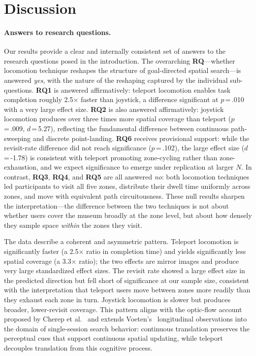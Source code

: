 \documentclass{vgtc}
\begin{document}
\section{Discussion}

\paragraph{Answers to research questions.}
Our results provide a clear and internally consistent set of answers to the research questions posed in the introduction. The overarching \textbf{RQ}---whether locomotion technique reshapes the structure of goal-directed spatial search---is answered \emph{yes}, with the nature of the reshaping captured by the individual sub-questions. \textbf{RQ1} is answered affirmatively: teleport locomotion enables task completion roughly 2.5$\times$ faster than joystick, a difference significant at $p$\,=\,.010 with a very large effect size. \textbf{RQ2} is also answered affirmatively: joystick locomotion produces over three times more spatial coverage than teleport ($p$\,=\,.009, $d$\,=\,5.27), reflecting the fundamental difference between continuous path-sweeping and discrete point-landing. \textbf{RQ6} receives provisional support: while the revisit-rate difference did not reach significance ($p$\,=\,.102), the large effect size ($d$\,=\,-1.78) is consistent with teleport promoting zone-cycling rather than zone-exhaustion, and we expect significance to emerge under replication at larger $N$. In contrast, \textbf{RQ3}, \textbf{RQ4}, and \textbf{RQ5} are all answered \emph{no}: both locomotion techniques led participants to visit all five zones, distribute their dwell time uniformly across zones, and move with equivalent path circuitousness. These null results sharpen the interpretation---the difference between the two techniques is not about whether users cover the museum broadly at the zone level, but about how densely they sample space \emph{within} the zones they visit.

The data describe a coherent and asymmetric pattern. Teleport locomotion is significantly faster (a 2.5$\times$ ratio in completion time) and yields significantly less spatial coverage (a 3.3$\times$ ratio); the two effects are mirror images and produce very large standardized effect sizes. The revisit rate showed a large effect size in the predicted direction but fell short of significance at our sample size, consistent with the interpretation that teleport users move between zones more readily than they exhaust each zone in turn. Joystick locomotion is slower but produces broader, lower-revisit coverage. This pattern aligns with the optic-flow account proposed by Cherep et al.~\cite{Cherep:2020:STV} and extends Voeten's~\cite{Voeten:2023:LMS} longitudinal observations into the domain of single-session search behavior: continuous translation preserves the perceptual cues that support continuous spatial updating, while teleport decouples translation from this cognitive process.
\end{document}
